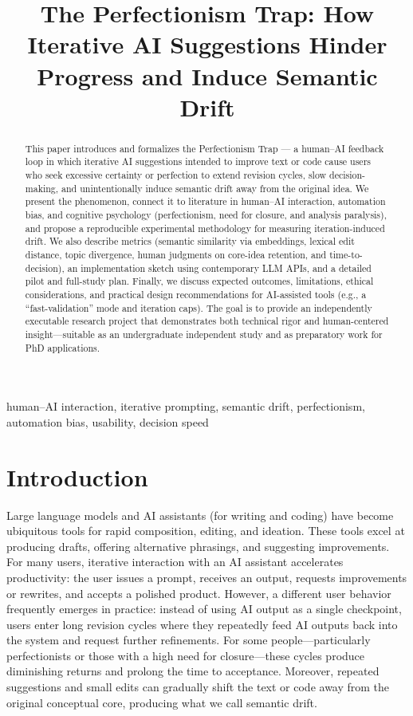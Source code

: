 \documentclass[conference]{IEEEtran} %
\title{The Perfectionism Trap: How Iterative AI Suggestions Hinder Progress and Induce Semantic Drift}
\author{
\IEEEauthorblockN{Obed Alemya Alenyorige}
\IEEEauthorblockA{alemyaobed@gmail.com\\
GitHub: \url{https://github.com/alemyaobed/}\\
LinkedIn: \url{https://www.linkedin.com/in/alemyaobed/}}
}
\begin{document}
\maketitle

\begin{abstract}
This paper introduces and formalizes the Perfectionism Trap — a human–AI feedback loop in which iterative AI suggestions intended to improve text or code cause users who seek excessive certainty or perfection to extend revision cycles, slow decision-making, and unintentionally induce semantic drift away from the original idea. We present the phenomenon, connect it to literature in human–AI interaction, automation bias, and cognitive psychology (perfectionism, need for closure, and analysis paralysis), and propose a reproducible experimental methodology for measuring iteration-induced drift. We also describe metrics (semantic similarity via embeddings, lexical edit distance, topic divergence, human judgments on core-idea retention, and time-to-decision), an implementation sketch using contemporary LLM APIs, and a detailed pilot and full-study plan. Finally, we discuss expected outcomes, limitations, ethical considerations, and practical design recommendations for AI-assisted tools (e.g., a “fast-validation” mode and iteration caps). The goal is to provide an independently executable research project that demonstrates both technical rigor and human-centered insight—suitable as an undergraduate independent study and as preparatory work for PhD applications.
\end{abstract}

\begin{IEEEkeywords}
human–AI interaction, iterative prompting, semantic drift, perfectionism, automation bias, usability, decision speed
\end{IEEEkeywords}

\section{Introduction}
Large language models and AI assistants (for writing and coding) have become ubiquitous tools for rapid composition, editing, and ideation. These tools excel at producing drafts, offering alternative phrasings, and suggesting improvements. For many users, iterative interaction with an AI assistant accelerates productivity: the user issues a prompt, receives an output, requests improvements or rewrites, and accepts a polished product. However, a different user behavior frequently emerges in practice: instead of using AI output as a single checkpoint, users enter long revision cycles where they repeatedly feed AI outputs back into the system and request further refinements. For some people—particularly perfectionists or those with a high need for closure—these cycles produce diminishing returns and prolong the time to acceptance. Moreover, repeated suggestions and small edits can gradually shift the text or code away from the original conceptual core, producing what we call semantic drift.
\end{document}
